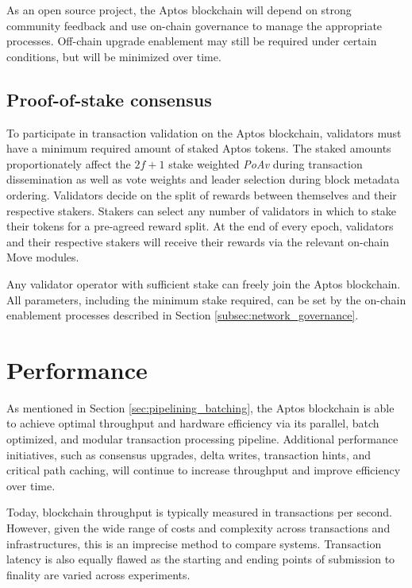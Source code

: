 \documentclass{article}
\begin{document}
As an open source project, the Aptos blockchain will depend on strong community feedback and use on-chain governance to manage the appropriate processes. Off-chain upgrade enablement may still be required under certain conditions, but will be minimized over time.

\subsection{Proof-of-stake consensus}

To participate in transaction validation on the Aptos blockchain, validators must have a minimum required amount of staked Aptos tokens. The staked amounts proportionately affect the $2f+1$ stake weighted \emph{PoAv} during transaction dissemination as well as vote weights and leader selection during block metadata ordering.  Validators decide on the split of rewards between themselves and their respective stakers. Stakers can select any number of validators in which to stake their tokens for a pre-agreed reward split. At the end of every epoch, validators and their respective stakers will receive their rewards via the relevant on-chain Move modules.

Any validator operator with sufficient stake can freely join the Aptos blockchain. All parameters, including the minimum stake required, can be set by the on-chain enablement processes described in Section \ref{subsec:network_governance}.

\section{Performance}
\label{sec:performance}

As mentioned in Section \ref{sec:pipelining_batching}, the Aptos blockchain is able to achieve optimal throughput and hardware efficiency via its parallel, batch optimized, and modular transaction processing pipeline. Additional performance initiatives, such as consensus upgrades, delta writes, transaction hints, and critical path caching, will continue to increase throughput and improve efficiency over time.

Today, blockchain throughput is typically measured in transactions per second. However, given the wide range of costs and complexity across transactions and infrastructures, this is an imprecise method to compare systems. Transaction latency is also equally flawed as the starting and ending points of submission to finality are varied across experiments.
\end{document}
